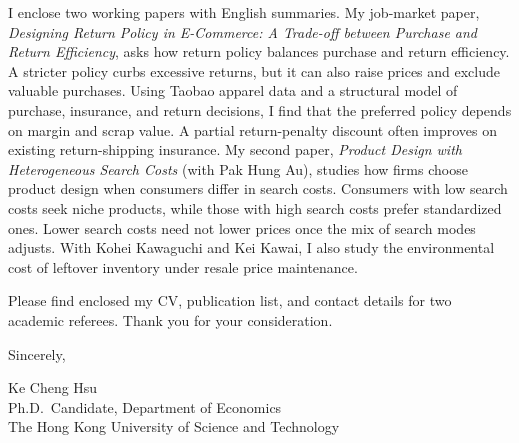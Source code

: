 \documentclass[11pt]{article}
\begin{document}
I enclose two working papers with English summaries. My job-market paper, \emph{Designing Return Policy in E-Commerce: A Trade-off between Purchase and Return Efficiency}, asks how return policy balances purchase and return efficiency. A stricter policy curbs excessive returns, but it can also raise prices and exclude valuable purchases. Using Taobao apparel data and a structural model of purchase, insurance, and return decisions, I find that the preferred policy depends on margin and scrap value. A partial return-penalty discount often improves on existing return-shipping insurance. My second paper, \emph{Product Design with Heterogeneous Search Costs} (with Pak Hung Au), studies how firms choose product design when consumers differ in search costs. Consumers with low search costs seek niche products, while those with high search costs prefer standardized ones. Lower search costs need not lower prices once the mix of search modes adjusts. With Kohei Kawaguchi and Kei Kawai, I also study the environmental cost of leftover inventory under resale price maintenance.

Please find enclosed my CV, publication list, and contact details for two academic referees. Thank you for your consideration.

\vspace{0.7em}
Sincerely,

\vspace{1.4em}
Ke Cheng Hsu \\
Ph.D.\ Candidate, Department of Economics \\
The Hong Kong University of Science and Technology
\end{document}
